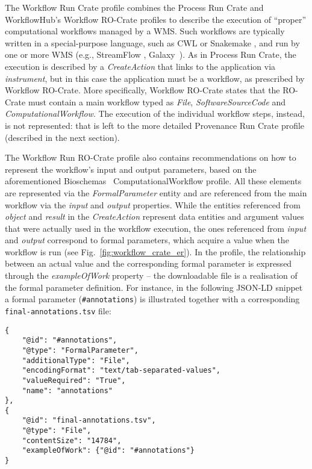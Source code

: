 \documentclass[10pt,letterpaper]{article}
\begin{document}
The Workflow Run Crate profile \cite{WRROC 2023b} combines the Process Run Crate and WorkflowHub's Workflow RO-Crate \cite{Bacall 2022} profiles to describe the execution of “proper” computational workflows managed by a WMS.
Such workflows are typically written in a special-purpose language, such as CWL or Snakemake
\cite{Koster 2012}, and run by one or more WMS (e.g., StreamFlow \cite{Colonnelli 2021}, Galaxy~\cite{Galaxy 2022}).
As in Process Run Crate, the execution is described by a \emph{CreateAction}
that links to the application via \emph{instrument}, but in this case the application must be a workflow, as prescribed by Workflow RO-Crate.
More specifically, Workflow RO-Crate states that the RO-Crate must contain a main workflow typed as \emph{File}, \emph{SoftwareSourceCode}
and \emph{ComputationalWorkflow}.
The execution of the individual workflow steps, instead, is not represented: that is left to the more detailed Provenance Run Crate profile (described in the next section).

The Workflow Run RO-Crate profile also contains recommendations on how to represent the workflow's input and output parameters, based on the aforementioned Bioschemas~\cite{Gray 2017} ComputationalWorkflow profile.
All these elements are represented via the \emph{FormalParameter} entity and are referenced from the main workflow via the \emph{input} and
\emph{output} properties.
While the entities referenced from
\emph{object} and \emph{result} in the \emph{CreateAction} represent data entities and argument values that were actually used in the workflow execution, the ones referenced from \emph{input} and
\emph{output} correspond to formal parameters, which acquire a value when the workflow is run (see Fig.~\ref{fig:workflow_crate_er}).
In the profile, the relationship between an actual value and the corresponding formal parameter is expressed through the \emph{exampleOfWork} property -- the downloadable file is a realisation of the formal parameter definition.
For instance, in the following JSON-LD snippet a formal parameter (\texttt{\#annotations}) is illustrated together with a corresponding \texttt{final-annotations.tsv} file:

\begin{verbatim}
{
    "@id": "#annotations",
    "@type": "FormalParameter",
    "additionalType": "File",
    "encodingFormat": "text/tab-separated-values",
    "valueRequired": "True",
    "name": "annotations"
},
{
    "@id": "final-annotations.tsv",
    "@type": "File",
    "contentSize": "14784",
    "exampleOfWork": {"@id": "#annotations"}
}
\end{verbatim}
\end{document}

